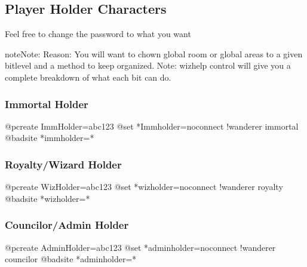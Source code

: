 \documentclass[letterpaper,10pt,english]{sphinxmanual}
\begin{document}
\begin{sphinxVerbatim}[commandchars=\\\{\}]
 
\end{sphinxVerbatim}


\subsection{Player Holder Characters}
\label{\detokenize{gettingstarted:player-holder-characters}}
\sphinxAtStartPar
Feel free to change the password to what you want

\begin{sphinxadmonition}{note}{Note:}
\sphinxAtStartPar
Reason: You will want to chown global room or global areas to a given bitlevel and a method to keep organized.
Note: wizhelp control will give you a complete breakdown of what each bit can do.
\end{sphinxadmonition}


\subsubsection{Immortal Holder}
\label{\detokenize{gettingstarted:immortal-holder}}
\begin{sphinxVerbatim}[commandchars=\\\{\}]
@pcreate ImmHolder=abc123
@set *Immholder=no\PYGZus{}connect !wanderer immortal
@badsite *immholder=*
\end{sphinxVerbatim}


\subsubsection{Royalty/Wizard Holder}
\label{\detokenize{gettingstarted:royalty-wizard-holder}}
\begin{sphinxVerbatim}[commandchars=\\\{\}]
@pcreate WizHolder=abc123
@set *wizholder=no\PYGZus{}connect !wanderer royalty
@badsite *wizholder=*
\end{sphinxVerbatim}


\subsubsection{Councilor/Admin Holder}
\label{\detokenize{gettingstarted:councilor-admin-holder}}
\begin{sphinxVerbatim}[commandchars=\\\{\}]
@pcreate AdminHolder=abc123
@set *adminholder=no\PYGZus{}connect !wanderer councilor
@badsite *adminholder=*
\end{sphinxVerbatim}
\end{document}
